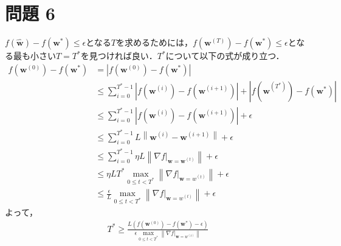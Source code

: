 \documentclass[a4paper,11pt]{jsarticle}
\begin{document}
\section*{問題 6}
$f(\hat{\bm w}) -f(\bm w^*) \le \epsilon $となる$T$を求めるためには，$f(\bm{w}^{(T)}) -f(\bm w^*) \le \epsilon $となる最も小さい$T=T^*$を見つければ良い．$T^*$について以下の式が成り立つ．
\begin{align*}
    f(\bm{w}^{(0)}) - f(\bm w^*) & = \left| f(\bm{w}^{(0)}) - f(\bm w^*) \right|                                                                                       \\
                                 & \le \sum_{i = 0}^{T^\ast - 1} \left| f(\bm{w}^{(i)}) - f(\bm{w}^{(i+1)}) \right| + \left| f(\bm{w}^{(T^\ast)}) - f(\bm w^*) \right| \\
                                 & \le \sum_{i = 0}^{T^\ast - 1} \left| f(\bm{w}^{(i)}) - f(\bm{w}^{(i+1)}) \right| + \epsilon                                         \\
                                 & \le \sum_{i = 0}^{T^\ast - 1} L \left\lVert \bm{w}^{(i)} - \bm{w}^{(i+1)} \right\lVert + \epsilon                                   \\
                                 & \le \sum_{i = 0}^{T^\ast - 1} \eta L \left\lVert \nabla f|_{\bm w = \bm{w}^{(t)}} \right\lVert + \epsilon                           \\
                                 & \le \eta L T^\ast \max_{0 \le t < T^\ast } \left\lVert \nabla f|_{\bm w = w^{(t)}} \right\lVert + \epsilon                          \\
                                 & \le \frac{\epsilon}{L} \max_{0 \le t < T^\ast } \left\lVert \nabla f|_{\bm w = w^{(t)}} \right\lVert + \epsilon
\end{align*}
よって，
\begin{align*}
    T^\ast \ge \frac{L(f(\bm{w}^{(0)}) - f(\bm w^*) - \epsilon)}{\epsilon \max_{0 \le t < T^\ast } \left\lVert \nabla f|_{\bm w = w^{(t)}} \right\lVert}
\end{align*}
\end{document}
